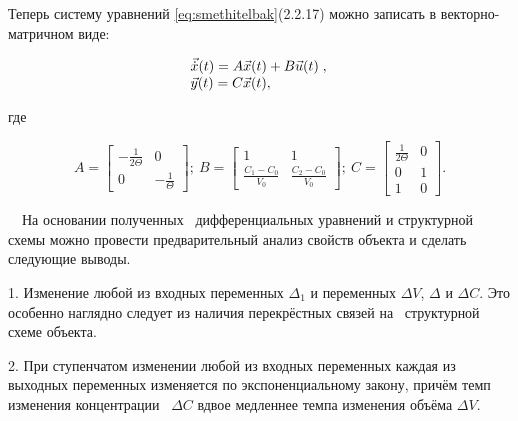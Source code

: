 		Теперь систему уравнений \eqref{eq:smethitelbak}(2.2.17) можно записать в векторно-матричном виде:


\begin{equation*}
\begin{matrix}\vec{\dot x}(t)=A\vec x(t)+B\vec u(t)\;,\hfill\null \\\vec y(t)=C\vec x(t),\hfill\null 
\end{matrix}\hfill 
\end{equation*}

		где



\begin{equation*}
		A=\left[\begin{matrix}-\frac 1{2\Theta }&0\\0&-\frac 1 \Theta \end{matrix}\right]; \ 
		B=\left[\begin{matrix}1&1\\\frac{C_1-C_0}{V_0}&\frac{C_2-C_0}{V_0}\end{matrix}\right]; \ 
		C=\left[\begin{matrix}\frac 1{2\Theta }&0\\0&1\\1&0\end{matrix}\right].
\end{equation*}
\bigskip



\bigskip


		\ \ На основании полученных \ дифференциальных уравнений и структурной схемы можно провести предварительный анализ
		свойств объекта и сделать следующие выводы.



		1. Изменение любой из входных переменных  $\mathit{\Delta  }_1$ и 
		переменных  $\mathit{\Delta V}$,  $\mathit{\Delta  }$ и  $\mathit{\Delta C}$. Это особенно наглядно следует из наличия перекрёстных
		связей на \ структурной схеме объекта.



		2. При ступенчатом изменении любой из входных переменных каждая из выходных переменных изменяется по экспоненциальному
		закону, причём темп изменения концентрации \  $\mathit{\Delta C}$ вдвое медленнее темпа изменения объёма  $\mathit{\Delta V}$.



